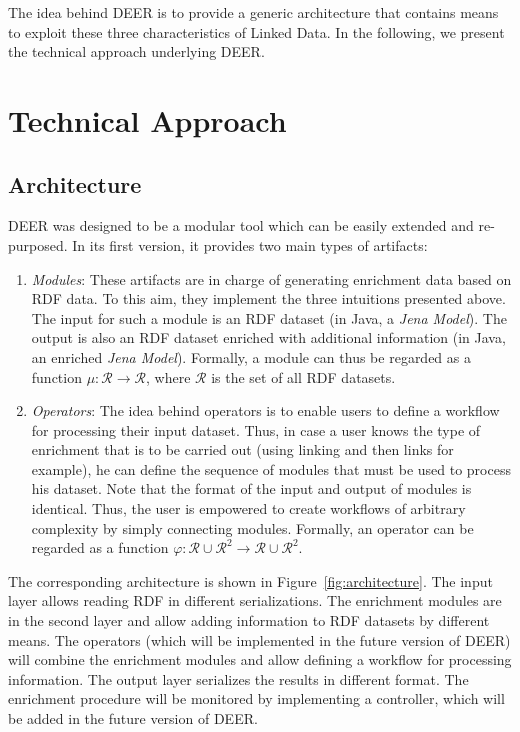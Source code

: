 \documentclass[a4paper,twoside,bibtotoc,abstracton,12pt,BCOR=15mm]{article}
\newcommand{\geolift}{\textsc{DEER}\xspace}
\begin{document}
The idea behind \geolift is to provide a generic architecture that contains means to exploit these three characteristics of Linked Data. 
In the following, we present the technical approach underlying \geolift.

\section{Technical Approach}
\subsection{Architecture}
\geolift was designed to be a modular tool which can be easily extended and re-purposed.
In its first version, it provides two main types of artifacts:
\begin{enumerate}
\item \emph{Modules}: These artifacts are in charge of generating enrichment data based on RDF data. 
To this aim, they implement the three intuitions presented above.
The input for such a module is an RDF dataset (in Java, a \emph{Jena Model}).
The output is also an RDF dataset enriched with additional information (in Java, an enriched \emph{Jena Model}).
Formally, a module can thus be regarded as a function $\mu: \mathcal{R} \rightarrow \mathcal{R}$, where $\mathcal{R}$ is the set of all RDF datasets.
\item \emph{Operators}: The idea behind operators is to enable users to define a workflow for processing their input dataset. 
Thus, in case a user knows the type of enrichment that is to be carried out (using linking and then links for example), he can define the sequence of modules that must be used to process his dataset.
Note that the format of the input and output of modules is identical. 
Thus, the user is empowered to create workflows of arbitrary complexity by simply connecting modules.
Formally, an operator can be regarded as a function $\varphi: \mathcal{R} \cup \mathcal{R}^2 \rightarrow \mathcal{R} \cup \mathcal{R}^2$.
\end{enumerate}
The corresponding architecture is shown in Figure~\ref{fig:architecture}. The input layer allows reading RDF in different serializations.
The enrichment modules are in the second layer and allow adding information to RDF datasets by different means.
The operators (which will be implemented in the future version of \geolift) will combine the enrichment modules and allow defining a workflow for processing information.
The output layer serializes the results in different format.
The enrichment procedure will be monitored by implementing a controller, which will be added in the future version of \geolift.
\end{document}
